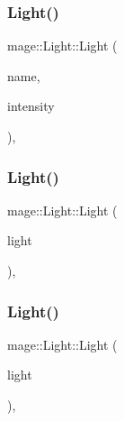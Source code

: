 \subsubsection{\texorpdfstring{Light()}{Light()}\hspace{0.1cm}{\footnotesize\ttfamily [1/3]}}
{\footnotesize\ttfamily mage\+::\+Light\+::\+Light (\begin{DoxyParamCaption}\item[{const string}]{name,  }\item[{const \hyperlink{structmage_1_1_r_g_b_spectrum}{R\+G\+B\+Spectrum} \&}]{intensity }\end{DoxyParamCaption})\hspace{0.3cm}{\ttfamily [explicit]}, {\ttfamily [protected]}}

\hypertarget{classmage_1_1_light_a334de10c1d8939b53e2193c08b67fe88}{}\label{classmage_1_1_light_a334de10c1d8939b53e2193c08b67fe88} 
\subsubsection{\texorpdfstring{Light()}{Light()}\hspace{0.1cm}{\footnotesize\ttfamily [2/3]}}
{\footnotesize\ttfamily mage\+::\+Light\+::\+Light (\begin{DoxyParamCaption}\item[{const \hyperlink{classmage_1_1_light}{Light} \&}]{light }\end{DoxyParamCaption})\hspace{0.3cm}{\ttfamily [protected]}, {\ttfamily [default]}}

\hypertarget{classmage_1_1_light_ad9d33c6249383fd0c7e58f97ff04eee8}{}\label{classmage_1_1_light_ad9d33c6249383fd0c7e58f97ff04eee8} 
\subsubsection{\texorpdfstring{Light()}{Light()}\hspace{0.1cm}{\footnotesize\ttfamily [3/3]}}
{\footnotesize\ttfamily mage\+::\+Light\+::\+Light (\begin{DoxyParamCaption}\item[{\hyperlink{classmage_1_1_light}{Light} \&\&}]{light }\end{DoxyParamCaption})\hspace{0.3cm}{\ttfamily [protected]}, {\ttfamily [default]}}



